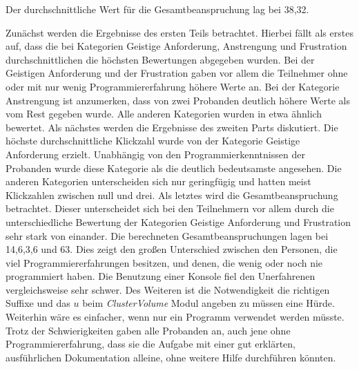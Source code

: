 \begin{table}[H]
\centering
{}
\caption{Durchschnittlichen Ergebnisse des NASA-TLX Bogens}
\label{tab:ergebnis_nasa}
\end{table}


Der durchschnittliche Wert für die Gesamtbeanspruchung lag bei 38,32. 


Zunächst werden die Ergebnisse des ersten Teils betrachtet. Hierbei fällt als erstes auf, dass die bei Kategorien Geistige Anforderung, Anstrengung und Frustration durchschnittlichen die höchsten Bewertungen abgegeben wurden.
Bei der Geistigen Anforderung und der Frustration gaben vor allem die Teilnehmer ohne oder mit nur wenig Programmiererfahrung höhere Werte an. Bei der Kategorie Anstrengung ist anzumerken, dass von zwei Probanden deutlich höhere Werte als vom Rest gegeben wurde.
Alle anderen Kategorien wurden in etwa ähnlich bewertet.
\newline
Als nächstes werden die Ergebnisse des zweiten Parts diskutiert. Die höchste durchschnittliche Klickzahl wurde von der Kategorie Geistige Anforderung erzielt. Unabhängig von den Programmierkenntnissen der Probanden wurde diese Kategorie als die deutlich bedeutsamste angesehen.
Die anderen Kategorien unterscheiden sich nur geringfügig und hatten meist Klickzahlen zwischen null und drei.
\newline
Als letztes wird die Gesamtbeanspruchung betrachtet. Dieser unterscheidet sich bei den Teilnehmern vor allem durch die unterschiedliche Bewertung der Kategorien Geistige Anforderung und Frustration sehr stark von einander.
Die berechneten Gesamtbeanspruchungen lagen bei 14,6,3,6 und 63. Dies zeigt den großen Unterschied zwischen den Personen, die viel Programmiererfahrungen besitzen, und denen, die wenig oder noch nie programmiert haben.
Die Benutzung einer Konsole fiel den Unerfahrenen vergleichsweise sehr schwer. Des Weiteren ist die Notwendigkeit die richtigen Suffixe und das $u$ beim \textit{ClusterVolume} Modul angeben zu müssen eine Hürde. Weiterhin wäre es einfacher, wenn nur ein Programm verwendet werden müsste.
\newline 
Trotz der Schwierigkeiten gaben alle Probanden an, auch jene ohne Programmiererfahrung, dass sie die Aufgabe mit einer gut erklärten, ausführlichen Dokumentation alleine, ohne weitere Hilfe durchführen könnten.

